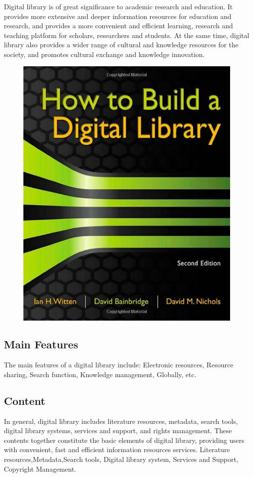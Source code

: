 Digital library is of great significance to academic research and education. It provides more extensive and deeper information resources for education and research, and provides a more convenient and efficient learning, research and teaching platform for scholars, researchers and students. At the same time, digital library also provides a wider range of cultural and knowledge resources for the society, and promotes cultural exchange and knowledge innovation.

\begin{figure}[htbp]
  \centerline{\includegraphics[width=500pt]{images/1-2-2.jpg}}
\end{figure}

\subsection{Main Features}
The main features of a digital library include:
Electronic resources, Resource sharing, Search function, Knowledge management, Globally, etc.

\subsection{Content}
In general, digital library includes literature resources, metadata, search tools, digital library systems, services and support, and rights management. These contents together constitute the basic elements of digital library, providing users with convenient, fast and efficient information resources services.
Literature resources,Metadata,Search tools, Digital library system, Services and Support, Copyright Management.

